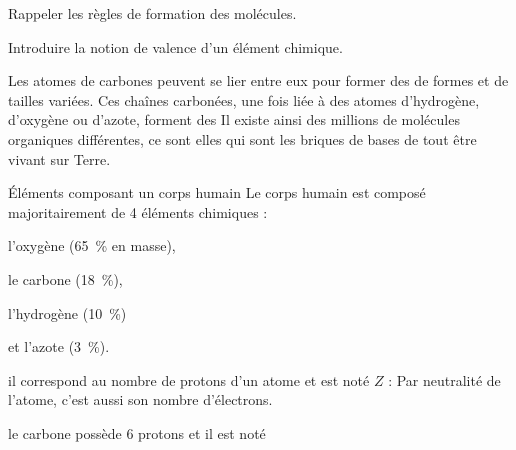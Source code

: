 \tetePremStssOrga
\vspace*{-30pt}

\begin{objectifs}
  \item Rappeler les règles de formation des molécules.
  \item Introduire la notion de valence d'un élément chimique.
\end{objectifs}

\begin{contexte}
  Les atomes de carbones peuvent se lier entre eux pour former des  de formes et de tailles variées.
  Ces chaînes carbonées, une fois liée à des atomes d'hydrogène, d'oxygène ou d'azote, forment des 
  Il existe ainsi des millions de molécules organiques différentes, ce sont elles qui sont les briques de bases de tout être vivant sur Terre.

\end{contexte}


\begin{doc}{Éléments composant un corps humain}
  Le corps humain est composé majoritairement de 4 éléments chimiques :
  \vspace*{-4pt}
  \begin{listePoints}[2]
    \item l'oxygène    (\qty{65}{\percent} en masse),
    \item le carbone   (\qty{18}{\percent}),
    \item l'hydrogène  (\qty{10}{\percent})
    \item et l'azote   (\qty{3}{\percent}).
  \end{listePoints}
  
  \begin{importants}
     il correspond au nombre de protons d'un atome et est noté $Z$ : 
    Par neutralité de l'atome, c'est aussi son nombre d'électrons.
  \end{importants}
   \exemple le carbone possède 6 protons et il est noté 
\end{doc}


